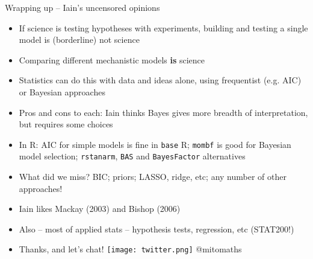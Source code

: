 \documentclass[10pt]{beamer}
\begin{document}
\begin{frame}{Wrapping up -- Iain's uncensored opinions}
  \begin{itemize}
  \item If science is testing hypotheses with experiments, building and testing a single model is (borderline) not science
  \item Comparing different mechanistic models \textbf{is} science
  \item Statistics can do this with data and ideas alone, using frequentist (e.g. AIC) or Bayesian approaches
  \item Pros and cons to each: Iain thinks Bayes gives more breadth of interpretation, but requires some choices
  \item In R: AIC for simple models is fine in \texttt{base} R; \texttt{mombf} is good for Bayesian model selection; \texttt{rstanarm}, \texttt{BAS} and \texttt{BayesFactor} alternatives
  \item What did we miss? BIC; priors; LASSO, ridge, etc; any number of other approaches!
  \item Iain likes Mackay (2003) and Bishop (2006)
        \item Also -- most of applied stats -- hypothesis tests, regression, etc (STAT200!)

  \item Thanks, and let's chat! \texttt{[image: twitter.png]} \footnotesize @mitomaths
    \end{itemize}
\end{frame}
\end{document}
